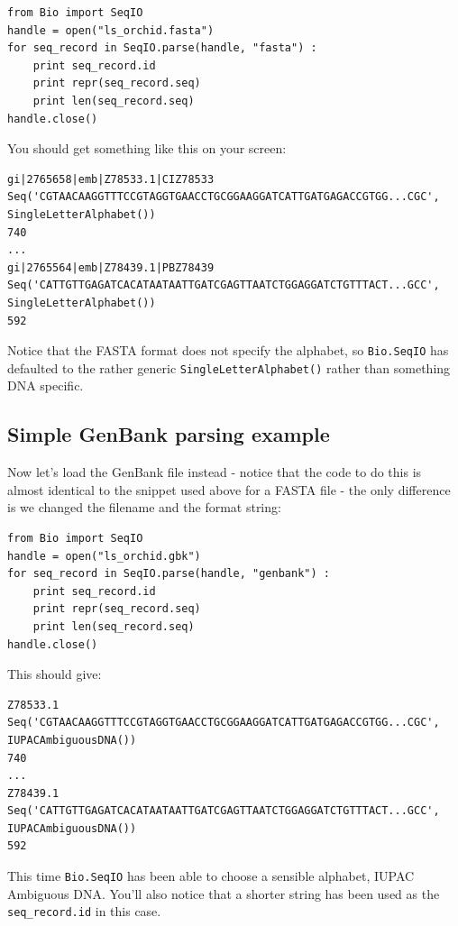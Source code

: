 \documentclass{report}
\begin{document}
\begin{verbatim}
from Bio import SeqIO
handle = open("ls_orchid.fasta")
for seq_record in SeqIO.parse(handle, "fasta") :
    print seq_record.id
    print repr(seq_record.seq)
    print len(seq_record.seq)
handle.close()
\end{verbatim}

\noindent You should get something like this on your screen:

\begin{verbatim}
gi|2765658|emb|Z78533.1|CIZ78533
Seq('CGTAACAAGGTTTCCGTAGGTGAACCTGCGGAAGGATCATTGATGAGACCGTGG...CGC', SingleLetterAlphabet())
740
...
gi|2765564|emb|Z78439.1|PBZ78439
Seq('CATTGTTGAGATCACATAATAATTGATCGAGTTAATCTGGAGGATCTGTTTACT...GCC', SingleLetterAlphabet())
592
\end{verbatim}

Notice that the FASTA format does not specify the alphabet, so \verb|Bio.SeqIO| has defaulted to the rather generic \verb|SingleLetterAlphabet()| rather than something DNA specific.

\subsection{Simple GenBank parsing example}

Now let's load the GenBank file instead - notice that the code to do this is almost identical to the snippet used above for a FASTA file - the only difference is we changed the filename and the format string:

\begin{verbatim}
from Bio import SeqIO
handle = open("ls_orchid.gbk")
for seq_record in SeqIO.parse(handle, "genbank") :
    print seq_record.id
    print repr(seq_record.seq)
    print len(seq_record.seq)
handle.close()
\end{verbatim}

\noindent This should give:

\begin{verbatim}
Z78533.1
Seq('CGTAACAAGGTTTCCGTAGGTGAACCTGCGGAAGGATCATTGATGAGACCGTGG...CGC', IUPACAmbiguousDNA())
740
...
Z78439.1
Seq('CATTGTTGAGATCACATAATAATTGATCGAGTTAATCTGGAGGATCTGTTTACT...GCC', IUPACAmbiguousDNA())
592
\end{verbatim}

This time \verb|Bio.SeqIO| has been able to choose a sensible alphabet, IUPAC Ambiguous DNA.  You'll also notice that a shorter string has been used as the \verb|seq_record.id| in this case.
\end{document}
